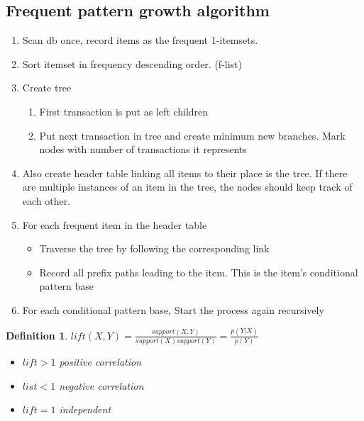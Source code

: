 \documentclass[a4paper]{article}
\newtheorem{definition}{Definition}
\begin{document}
\subsection{Frequent pattern growth algorithm}
\begin{enumerate}
		\item Scan db once, record items as the frequent 1-itemsets.
		\item Sort itemset in frequency descending order. (f-list)
		\item Create tree
				\begin{enumerate}
						\item First transaction is put as left children
						\item Put next transaction in tree and create minimum
								new branches. Mark nodes with number of
								transactions it represents
				\end{enumerate}
		\item Also create header table linking all items to their place is the
				tree. If there are multiple instances of an item in the tree,
				the nodes should keep track of each other.
		\item For each frequent item in the header table
				\begin{itemize}
						\item Traverse the tree by following the corresponding
								link
						\item Record all prefix paths leading to the item. This
								is the item's conditional pattern base
				\end{itemize}
		\item For each conditional pattern base, Start the process again
				recursively
\end{enumerate}
\begin{definition}
		$lift(X,Y) =
		\frac{support(X,Y)}{support(X)support(Y)}=\frac{p(Y|X)}{p(Y)}$
		\begin{itemize}
				\item $lift >1$ positive correlation
				\item $list <1 $ negative correlation
				\item $lift = 1$ independent
		\end{itemize}
\end{definition}
\end{document}
